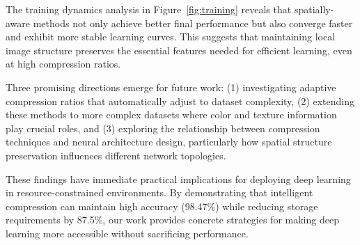 \documentclass{article} %
\begin{document}
The training dynamics analysis in Figure~\ref{fig:training} reveals that spatially-aware methods not only achieve better final performance but also converge faster and exhibit more stable learning curves. This suggests that maintaining local image structure preserves the essential features needed for efficient learning, even at high compression ratios.

Three promising directions emerge for future work: (1) investigating adaptive compression ratios that automatically adjust to dataset complexity, (2) extending these methods to more complex datasets where color and texture information play crucial roles, and (3) exploring the relationship between compression techniques and neural architecture design, particularly how spatial structure preservation influences different network topologies.

These findings have immediate practical implications for deploying deep learning in resource-constrained environments. By demonstrating that intelligent compression can maintain high accuracy (98.47\%) while reducing storage requirements by 87.5\%, our work provides concrete strategies for making deep learning more accessible without sacrificing performance.



\end{document}
